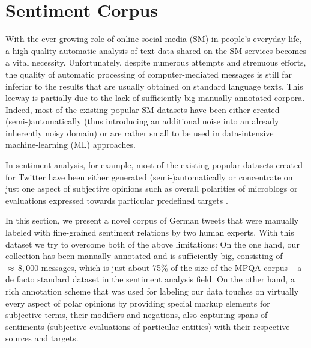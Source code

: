 

\section{Sentiment Corpus}\label{sec:snt:corpus}

With the ever growing role of online social media (SM) in people's
everyday life, a high-quality automatic analysis of text data shared
on the SM services becomes a vital necessity.  Unfortunately, despite
numerous attempts and strenuous efforts, the quality of automatic
processing of computer-mediated messages is still far inferior to the
results that are usually obtained on standard language texts.  This
leeway is partially due to the lack of sufficiently big manually
annotated corpora.  Indeed, most of the existing popular SM datasets
\cite{Go:09,Pak:10} have been either created (semi-)automatically
(thus introducing an additional noise into an already inherently noisy
domain) or are rather small to be used in data-intensive
machine-learning (ML) approaches.

In sentiment analysis, for example, most of the existing popular
datasets created for Twitter have been either generated
(semi-)automatically \cite{Go:09,Barbosa:10,Pak:10,Bora:12} or
concentrate on just one aspect of subjective opinions such as overall
polarities of microblogs \cite{Diakopoulos:10,Nakov:13} or evaluations
expressed towards particular predefined targets
\cite{Jiang:11,Saif:13}.

In this section, we present a novel corpus of German tweets that were
manually labeled with fine-grained sentiment relations by two human
experts.  With this dataset we try to overcome both of the above
limitations: On the one hand, our collection has been manually
annotated and is sufficiently big, consisting of ${\approx}\,8,000$
messages, which is just about 75\% of the size of the MPQA corpus
\cite{Wiebe:05} -- a de facto standard dataset in the sentiment
analysis field.  On the other hand, a rich annotation scheme that was
used for labeling our data touches on virtually every aspect of polar
opinions by providing special markup elements for subjective terms,
their modifiers and negations, also capturing spans of sentiments
(subjective evaluations of particular entities) with their respective
sources and targets.

